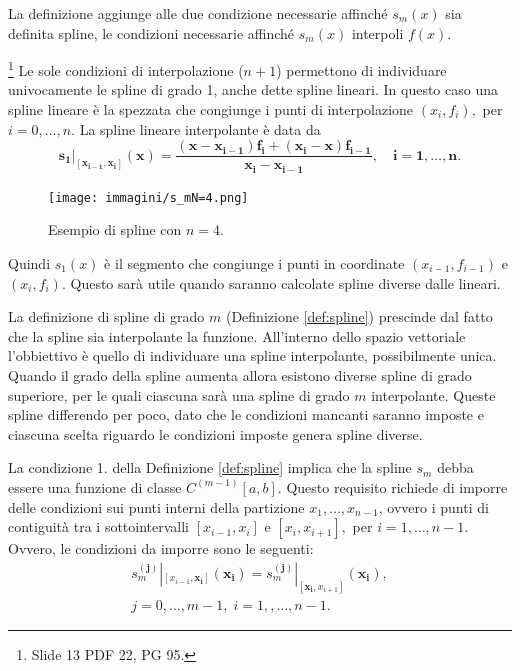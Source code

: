 La definizione aggiunge alle due condizione necessarie affinché $s_m(x)$ sia definita spline, le condizioni necessarie affinché $s_m(x)$ interpoli $f(x)$.

\begin{remark}
    \footnote{Slide 13 PDF 22, PG 95.} Le sole condizioni di interpolazione ($n+1$) permettono di individuare univocamente le spline di grado 1, anche dette spline lineari. In questo caso una spline lineare è la spezzata che congiunge i punti di interpolazione $(x_i,f_i),$ per $i=0,\hdots, n$. La spline lineare interpolante è data da 
    \begin{equation}\label{eq:splineLineare}
        \boldsymbol{s_1|_{[x_{i-1}, x_i]}(x)=\frac{(x-x_{i-1})f_i+(x_i-x)f_{i-1}}{x_i-x_{i-1}},\quad i=1,\hdots,n.}
    \end{equation}
\end{remark}

\begin{figure}
    \centering
    \texttt{[image: immagini/s\_mN=4.png]}
    \caption{Esempio di spline con $n=4$.}\label{fig:s_mN=4}
\end{figure}

Quindi $s_1(x)$ è il segmento che congiunge i punti in coordinate $(x_{i-1},f_{i-1})$ e $(x_i,f_i)$. Questo sarà utile quando saranno calcolate spline diverse dalle lineari.

La definizione di spline di grado $m$ (Definizione \ref{def:spline}) prescinde dal fatto che la spline sia interpolante la funzione. All'interno dello spazio vettoriale l'obbiettivo è quello di individuare una spline interpolante, possibilmente unica.
Quando il grado della spline aumenta allora esistono diverse spline di grado superiore, per le quali ciascuna sarà una spline di grado $m$ interpolante. Queste spline differendo per poco, dato che le condizioni mancanti saranno imposte e ciascuna scelta riguardo le condizioni imposte genera spline diverse.

La condizione 1. della Definizione \ref{def:spline} implica che la spline $s_m$ debba essere una funzione di classe $C^{(m-1)}[a,b]$. Questo requisito richiede di imporre delle condizioni sui punti interni della partizione $x_1,\hdots,x_{n-1}$, ovvero i punti di contiguità tra i sottointervalli $[x_{i-1},x_i]$ e $[x_i,x_{i+1}],$ per $ i=1,\hdots,n-1$. Ovvero, le condizioni da imporre sono le seguenti:
\begin{equation}\label{eq:condInterpSpline2}
    \begin{matrix}
        s_m^{(\boldsymbol{j})}|_{[x_{i-1},\boldsymbol{x_i}]}(\boldsymbol{x_i})= s_m^{(\boldsymbol{j})}|_{[\boldsymbol{x_i},x_{i+1}]}(\boldsymbol{x_i}),\\
        j=0,\hdots,m-1,\; i=1,,\hdots,n-1.
    \end{matrix}
\end{equation}

